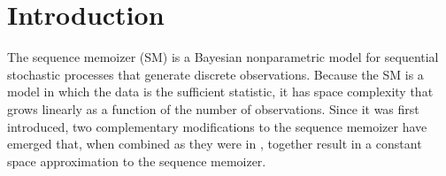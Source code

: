 \section{Introduction}
\label{sec:introduction}


The sequence memoizer \citep{Wood2009, Wood-2011-CACM} (SM) is a Bayesian nonparametric model for sequential stochastic processes that generate discrete observations.  Because the SM is a model in which the data is the sufficient statistic, it has space complexity that grows linearly as a function of the number of observations.  Since it was first introduced, two complementary modifications to the sequence memoizer have emerged \citep{Bartlett2010,Gasthaus2011} that, when combined as they were in \citep{Bartlett-2011-DCC}, together result in a constant space approximation to the sequence memoizer.  %

